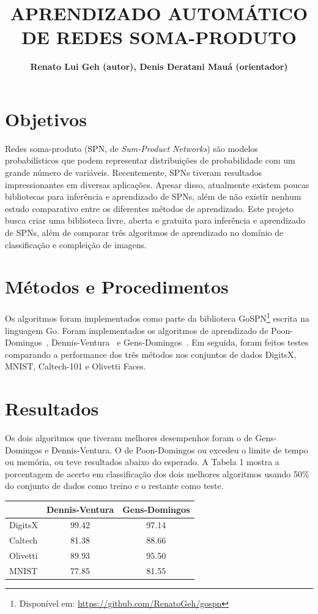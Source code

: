 \documentclass[10pt,a4paper]{article}
\title{APRENDIZADO AUTOMÁTICO DE REDES SOMA-PRODUTO}
\author{\textbf{Renato Lui Geh (autor), Denis Deratani Mauá (orientador)}}
\affil{Instituto de Matemática e Estatística, Universidade de São Paulo}
\affil{\fontsize{10pt}{12}\selectfont\{renatolg,ddm\}@ime.usp.br}
\date{}
\begin{document}
\maketitle

\begin{multicols*}{2}

\section*{Objetivos}

Redes soma-produto (SPN, de \textit{Sum-Product Networks}) são modelos probabilísticos que podem
representar distribuições de probabilidade com um grande número de variáveis.  Recentemente, SPNs
tiveram resultados impressionantes em diversas aplicações.  Apesar disso, atualmente existem poucas
bibliotecas para inferência e aprendizado de SPNs, além de não existir nenhum estudo comparativo
entre os diferentes métodos de aprendizado.  Este projeto busca criar uma biblioteca livre, aberta
e gratuita para inferência e aprendizado de SPNs, além de comparar três algoritmos de aprendizado
no domínio de classificação e compleição de imagens.

\section*{Métodos e Procedimentos}

Os algoritmos foram implementados como parte da biblioteca GoSPN\footnote{Disponível em:
  \url{https://github.com/RenatoGeh/gospn}} escrita na linguagem Go.  Foram implementados os
algoritmos de aprendizado de Poon-Domingos~\cite{poon-domingos}, Dennis-Ventura~\cite{clustering} e
Gens-Domingos~\cite{gens-domingos}. Em seguida, foram feitos testes comparando a performance dos
três métodos nos conjuntos de dados DigitsX, MNIST, Caltech-101 e Olivetti Faces.

\section*{Resultados}

Os dois algoritmos que tiveram melhores desempenhos foram o de Gens-Domingos e Dennis-Ventura. O de
Poon-Domingos ou excedeu o limite de tempo ou memória, ou teve resultados abaixo do esperado. A
Tabela 1 mostra a porcentagem de acerto em classificação dos dois melhores algoritmos usando 50\%
do conjunto de dados como treino e o restante como teste.
\vspace{-0.2cm}
\begin{tabular}{l|c|c}
  & Dennis-Ventura & Gens-Domingos\\
  \hline
  DigitsX & 99.42 & 97.14\\
  Caltech & 81.38 & 88.66\\
  Olivetti& 89.93 & 95.50\\
  MNIST   & 77.85 & 81.55\\
\end{tabular}


\end{multicols*}
\end{document}
